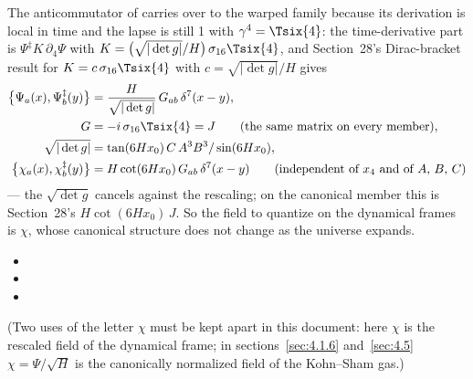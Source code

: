 The anticommutator of  carries over to the warped family because its derivation is
local in time and the lapse is still 1 with $\gamma^4=\Tsix{4}$: the time-derivative part is
$\Psi^{\ddagger}K\,\partial_4\Psi$ with $K=\bigl(\sqrt{|\det g|}/H\bigr)\,\sigma_{16}\Tsix{4}$, and
Section~28's Dirac-bracket result for $K=c\,\sigma_{16}\Tsix{4}$ with $c=\sqrt{|\det g|}/H$ gives
\begin{align*}
  \bigl\{\Psi_a(x),\Psi^{\ddagger}_b(y)\bigr\}&=\frac{H}{\sqrt{|\det g|}}\,G_{ab}\,\delta^7(x-y),\\
  G&=-i\,\sigma_{16}\Tsix{4}=J\qquad\text{(the same matrix on every member)},\\
  \sqrt{|\det g|}&=\tan(6Hx_0)\,C\,A^3B^3/\sin(6Hx_0),\\
  \bigl\{\chi_a(x),\chi^{\ddagger}_b(y)\bigr\}&=H\cot(6Hx_0)\,G_{ab}\,\delta^7(x-y)\qquad\text{(independent of $x_4$ and of $A$, $B$, $C$)}
\end{align*}
--- the $\sqrt{\det g}$ cancels against the rescaling; on the canonical member this is Section~28's
$H\cot(6Hx_0)\,J$. So the field to quantize on the dynamical frames is $\chi$, whose canonical structure
does not change as the universe expands. 
\begin{itemize}
  \item {}
  \item {}
  \item {}
\end{itemize}

(Two uses of the letter $\chi$ must be kept apart in this document: here $\chi$ is the rescaled field of the
dynamical frame; in sections~\ref{sec:4.1.6} and~\ref{sec:4.5} $\chi=\Psi/\sqrt H$ is the canonically
normalized field of the Kohn--Sham gas.)

